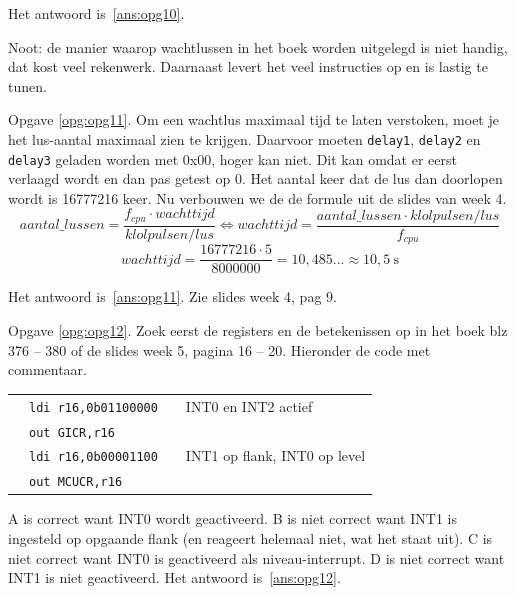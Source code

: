 \documentclass[a4paper,12pt,fleqn,dutch,mimicwordtwentyten]{tisdexam}
\begin{document}
\begin{questions}
Het antwoord is~\ref{ans:opg10}.

Noot: de manier waarop wachtlussen in het boek worden uitgelegd is niet
handig, dat kost veel rekenwerk. Daarnaast levert het veel instructies op
en is lastig te tunen.

\vspace{1em}
Opgave \ref{opg:opg11}.\label{sol:opg11}
Om een wachtlus maximaal tijd te laten verstoken, moet je het lus-aantal
maximaal zien te krijgen. Daarvoor moeten \texttt{delay1}, \texttt{delay2} en
\texttt{delay3} geladen worden met 0x00, hoger kan niet. Dit kan omdat er eerst
verlaagd wordt en dan pas getest op 0. Het aantal keer dat de lus dan doorlopen
wordt is 16777216 keer. Nu verbouwen we de de formule uit de slides van week 4.
\begin{equation*}
aantal\_lussen = \dfrac{f_{cpu} \cdot wachttijd}{klolpulsen/lus} 
                 \Longleftrightarrow wachttijd = 
                 \dfrac{aantal\_lussen \cdot klolpulsen/lus}{f_{cpu}}
\end{equation*} 
\begin{equation*}
wachttijd = \dfrac{16777216 \cdot 5}{8000000} = 10,485... 
            \approx 10,5 \: \text{s}
\end{equation*} 

Het antwoord is~\ref{ans:opg11}. Zie slides week 4, pag 9.

\vspace{1em}
Opgave \ref{opg:opg12}.\label{sol:opg12}
Zoek eerst de registers en de betekenissen op in het boek blz 376 -- 380
of de slides week 5, pagina 16 -- 20. Hieronder de code met commentaar.

\begin{table}[h!]
	\begin{tabular}{l l l l}
		 & \texttt{ldi r16,0b01100000}   &  &  INT0 en INT2 actief  \\ 
	 	 & \texttt{out GICR,r16}         &  &    \\ 
		 & \texttt{ldi r16,0b00001100}   &  &  INT1 op flank, INT0 op level \\ 
	 	 & \texttt{out MCUCR,r16}        &  &    \\ 
	\end{tabular} 
\end{table}

A is correct want INT0 wordt geactiveerd. B is niet correct want INT1 is
ingesteld op opgaande flank (en reageert helemaal niet, wat het staat uit).
C is niet correct want INT0 is geactiveerd als niveau-interrupt. D is niet
correct want INT1 is niet geactiveerd. Het antwoord is~\ref{ans:opg12}.


\end{questions}
\end{document}
